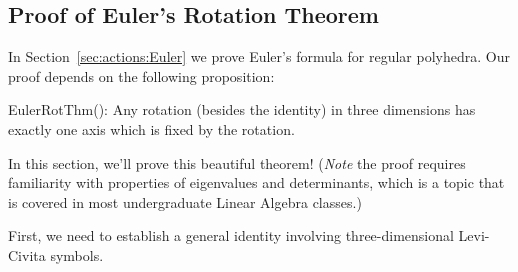 \subsection{Proof of Euler's Rotation Theorem}\label{subsec:EulerRot}

In Section~\ref{sec:actions:Euler} we prove Euler's formula for regular polyhedra. Our proof depends on the following proposition:

\begin{prop}{EulerRotThm}(): Any rotation (besides the identity) in three dimensions has exactly one axis which is fixed by the rotation.
\end{prop}

In this section, we'll prove this beautiful theorem!  (\emph{Note} the proof requires familiarity with properties of eigenvalues and determinants, which is a topic that is covered in most undergraduate Linear Algebra classes.)

First, we need to establish a general identity involving three-dimensional Levi-Civita symbols.

